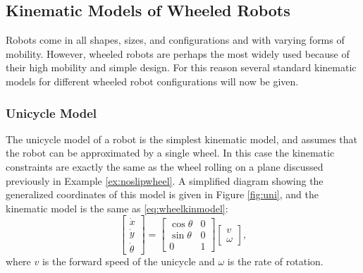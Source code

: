 \subsection{Kinematic Models of Wheeled Robots}
Robots come in all shapes, sizes, and configurations and with varying forms of mobility. However, wheeled robots are perhaps the most widely used because of their high mobility and simple design. For this reason several standard kinematic models for different wheeled robot configurations will now be given.

\subsubsection{Unicycle Model} \label{subsubsec:uni}
The unicycle model of a robot is the simplest kinematic model, and assumes that the robot can be approximated by a single wheel. In this case the kinematic constraints are exactly the same as the wheel rolling on a plane discussed previously in Example \ref{ex:noslipwheel}. A simplified diagram showing the generalized coordinates of this model is given in Figure \ref{fig:uni}, and the kinematic model is the same as \eqref{eq:wheelkinmodel}:
\begin{equation} \label{eq:uni}
\begin{bmatrix}
\dot{x} \\ \dot{y} \\ \dot{\theta}
\end{bmatrix} = \begin{bmatrix}
\cos \theta & 0 \\
\sin\theta & 0 \\
0 & 1
\end{bmatrix}\begin{bmatrix}
v \\ \omega
\end{bmatrix},
\end{equation}
where $v$ is the forward speed of the unicycle and $\omega$ is the rate of rotation.

